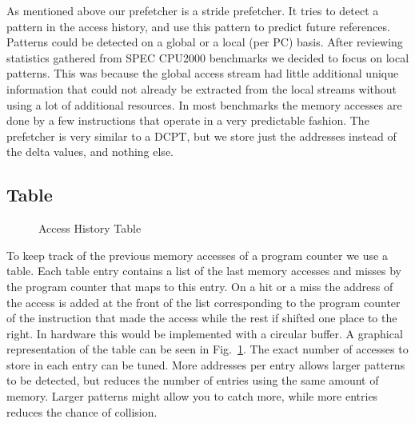 As mentioned above our prefetcher is a stride prefetcher. It tries to detect a 
pattern in the access history, and use this pattern to predict future 
references. Patterns could be detected on a global or a local (per PC) basis.
After reviewing statistics gathered from SPEC CPU2000 benchmarks we decided to 
focus on local patterns. This was because the global access stream had little 
additional unique information that could not already be extracted from the 
local streams without using a lot of additional resources. In most benchmarks 
the memory accesses are done by a few instructions that operate in a very 
predictable fashion. The prefetcher is very similar to a DCPT, but we store just the 
addresses instead of the delta values, and nothing else.

\subsection{Table}

\begin{figure}
	\caption{Access History Table}
	\label{fig:table}
\end{figure}

To keep track of the previous memory accesses of a program counter we use a
table. Each table entry contains a list of the last memory accesses and misses
by the program counter that maps to this entry. On a hit or a miss the address
of the access is added at the front of the list corresponding to the program
counter of the instruction that made the access while the rest if shifted one
place to the right. In hardware this would be implemented with a circular buffer. A
graphical representation of the table can be seen in Fig.~\ref{fig:table}. The
exact number of accesses to store in each entry can be tuned. More addresses
per entry allows larger patterns to be detected, but reduces the number of
entries using the same amount of memory. Larger patterns might allow you to
catch more, while more entries reduces the chance of collision.

